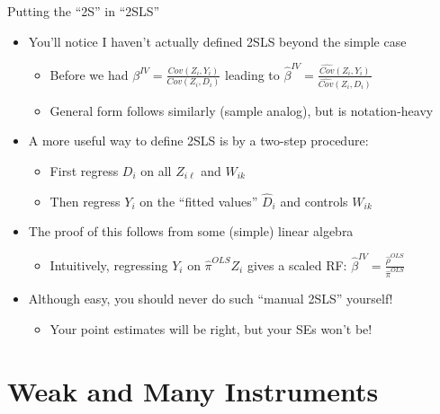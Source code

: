 \documentclass{beamer}
\begin{document}
\begin{frame}{Putting the ``2S'' in ``2SLS''}
\begin{itemize}
\item You'll notice I haven't actually defined 2SLS beyond the simple case\smallskip
\begin{itemize}
\item Before we had $\beta^{IV}=\frac{Cov(Z_i,Y_i)}{Cov(Z_i,D_i)}$ leading to $\widehat\beta^{IV}=\frac{\widehat{Cov}(Z_i,Y_i)}{\widehat{Cov}(Z_i,D_i)}$ 
\item General form follows similarly (sample analog), but is notation-heavy
\end{itemize}
\bigskip\pause{}
\item A more useful way to define 2SLS is by a two-step procedure:\smallskip
\begin{itemize}
\item First regress $D_i$ on all $Z_{i\ell}$ and $W_{ik}$\smallskip
\item Then regress $Y_i$ on the ``fitted values'' $\widehat{D}_i$ and controls $W_{ik}$ 
\end{itemize}\bigskip\pause{}
\item The proof of this follows from some (simple) linear algebra \smallskip
\begin{itemize}
\item Intuitively, regressing $Y_i$ on $\widehat{\pi}^{OLS}Z_i$ gives a scaled RF: $\widehat\beta^{IV}=\frac{\widehat{\rho}^{OLS}}{\widehat{\pi}^{OLS}}$
\end{itemize}\bigskip\pause{}
\item Although easy, you should never do such ``manual 2SLS'' yourself!\smallskip
\begin{itemize}
\item Your point estimates will be right, but your SEs won't be!
\end{itemize}
\end{itemize}
\end{frame}

\section{Weak and Many Instruments}
\end{document}
